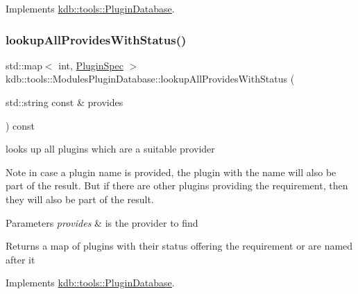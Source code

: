 Implements \hyperlink{classkdb_1_1tools_1_1PluginDatabase_a3ed261ad8562c423b64cf34cbc086161}{kdb\+::tools\+::\+Plugin\+Database}.

\mbox{\label{classkdb_1_1tools_1_1ModulesPluginDatabase_abe19487ff2a2e0548288dfa2a5678ae1}} 
\subsubsection{\texorpdfstring{lookup\+All\+Provides\+With\+Status()}{lookupAllProvidesWithStatus()}}
{\footnotesize\ttfamily std\+::map$<$ int, \hyperlink{classkdb_1_1tools_1_1PluginSpec}{Plugin\+Spec} $>$ kdb\+::tools\+::\+Modules\+Plugin\+Database\+::lookup\+All\+Provides\+With\+Status (\begin{DoxyParamCaption}\item[{std\+::string const \&}]{provides }\end{DoxyParamCaption}) const\hspace{0.3cm}{\ttfamily [virtual]}}



looks up all plugins which are a suitable provider 

\begin{DoxyNote}{Note}
in case a plugin name is provided, the plugin with the name will also be part of the result. But if there are other plugins providing the requirement, then they will also be part of the result.
\end{DoxyNote}

\begin{DoxyParams}{Parameters}
{\em provides} & is the provider to find\\
\hline
\end{DoxyParams}
\begin{DoxyReturn}{Returns}
a map of plugins with their status offering the requirement or are named after it 
\end{DoxyReturn}


Implements \hyperlink{classkdb_1_1tools_1_1PluginDatabase_aa918b547973f627a5604fa3b2b3faf30}{kdb\+::tools\+::\+Plugin\+Database}.

